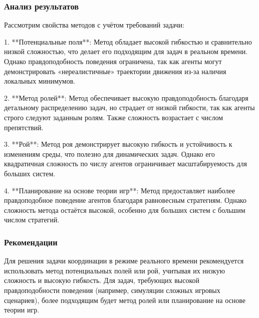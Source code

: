 \subsubsection*{Анализ результатов}
Рассмотрим свойства методов с учётом требований задачи:

1. **Потенциальные поля**:  
Метод обладает высокой гибкостью и сравнительно низкой сложностью, что делает его подходящим для задач в реальном времени. Однако правдоподобность поведения ограничена, так как агенты могут демонстрировать «нереалистичные» траектории движения из-за наличия локальных минимумов.

2. **Метод ролей**:  
Метод обеспечивает высокую правдоподобность благодаря детальному распределению задач, но страдает от низкой гибкости, так как агенты строго следуют заданным ролям. Также сложность возрастает с числом препятствий.

3. **Рой**:  
Метод роя демонстрирует высокую гибкость и устойчивость к изменениям среды, что полезно для динамических задач. Однако его квадратичная сложность по числу агентов ограничивает масштабируемость для больших систем.

4. **Планирование на основе теории игр**:  
Метод предоставляет наиболее правдоподобное поведение агентов благодаря равновесным стратегиям. Однако сложность метода остаётся высокой, особенно для больших систем с большим числом стратегий.

\subsubsection*{Рекомендации}
Для решения задачи координации в режиме реального времени рекомендуется использовать метод потенциальных полей или рой, учитывая их низкую сложность и высокую гибкость. Для задач, требующих высокой правдоподобности поведения (например, симуляции сложных игровых сценариев), более подходящим будет метод ролей или планирование на основе теории игр.